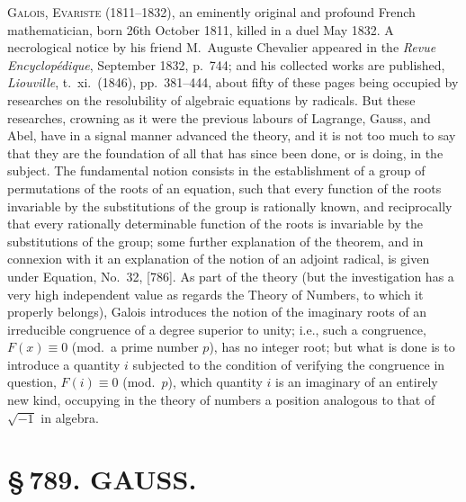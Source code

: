 \documentclass[11pt,a4paper]{book}
\begin{document}
\textsc{Galois, Evariste} (1811--1832), an eminently original and profound French mathematician, born 26th October 1811, killed in a duel May 1832. A necrological notice by his friend M.\ Auguste Chevalier appeared in the \textit{Revue Encyclop\'{e}dique}, September 1832, p.~744; and his collected works are published, \textit{Liouville}, t.~xi.\ (1846), pp.~381--444, about fifty of these pages being occupied by researches on the resolubility of algebraic equations by radicals. But these researches, crowning as it were the previous labours of Lagrange, Gauss, and Abel, have in a signal manner advanced the theory, and it is not too much to say that they are the foundation of all that has since been done, or is doing, in the subject. The fundamental notion consists in the establishment of a group of permutations of the roots of an equation, such that every function of the roots invariable by the substitutions of the group is rationally known, and reciprocally that every rationally determinable function of the roots is invariable by the substitutions of the group; some further explanation of the theorem, and in connexion with it an explanation of the notion of an adjoint radical, is given under Equation, No.~32, [786]. As part of the theory (but the investigation has a very high independent value as regards the Theory of Numbers, to which it properly belongs), Galois introduces the notion of the imaginary roots of an irreducible congruence of a degree superior to unity; i.e., such a congruence, $F(x) \equiv 0$ (mod.\ a prime number $p$), has no integer root; but what is done is to introduce a quantity $i$ subjected to the condition of verifying the congruence in question, $F(i) \equiv 0$ (mod.\ $p$), which quantity $i$ is an imaginary of an entirely new kind, occupying in the theory of numbers a position analogous to that of $\sqrt{-1}$ in algebra.

\newpage
\section*{\S\,789. GAUSS.}


\smallskip
\end{document}
